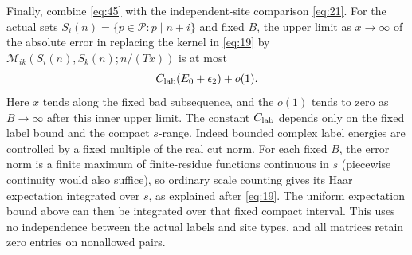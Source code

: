 Finally, combine \eqref{eq:45} with the independent-site comparison
\eqref{eq:21}.  For the actual sets
$S_i(n)=\{p\in\mathcal P:p\mid n+i\}$ and fixed $B$, the upper
limit as $x\to\infty$ of the absolute error in replacing the kernel
in \eqref{eq:19} by
$\mathcal M_{ik}(S_i(n),S_k(n);n/(Tx))$ is at most
\[
 C_{\rm lab}(E_0+\epsilon_2)+o(1).
\]
Here $x$ tends along the fixed bad subsequence, and the $o(1)$ tends
to zero as $B\to\infty$ after this inner upper limit.  The constant
$C_{\rm lab}$ depends
only on the fixed label bound and the compact $s$-range.
Indeed bounded complex label energies are controlled by a fixed
multiple of the real cut norm.  For each fixed $B$, the error
norm is a finite maximum of finite-residue functions continuous
in $s$ (piecewise continuity would also suffice), so ordinary
scale counting gives its Haar expectation integrated over $s$,
as explained after \eqref{eq:19}.  The uniform expectation bound
above can then be integrated over that fixed compact interval.
This uses no independence between the actual labels and site
types, and all matrices retain zero entries on nonallowed pairs.
